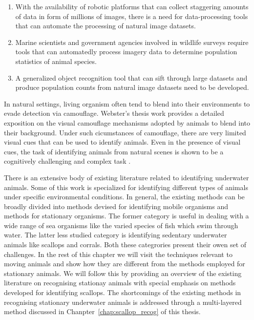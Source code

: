 \documentclass {udthesis}
\begin{document}
\begin{enumerate}[label=Section \arabic*:, start=0]
  \begin{enumerate} [label=Para \arabic*:, start=1]
   
   \item With the availability of robotic platforms that can collect staggering amounts of data in form of millions of images, there is a need for data-processing tools that can automate the processing of natural image datasets.
   
   \item Marine scientists and government agencies involved in wildlife surveys require tools that can automatedly process imagery data to determine population statistics of animal species.
   
   \item A generalized object recognition tool that can sift through large datasets and produce population counts from natural image datasets need to be developed.
   
  \end{enumerate}

\end{enumerate}


In natural settings, living organism often tend to blend into their environments to evade detection via camouflage. Webster's thesis work \cite{webster} provides a detailed exposition on the visual camouflage mechanisms adopted by animals to blend into their background. Under such cicumstances of camouflage, there are very limited visual cues that can be used to identify animals. Even in the presence of visual cues, the task of identifying animals from natural scenes is shown to be a cognitively challenging and complex task \cite{wichmann}.

There is an extensive body of existing literature related to identifying underwater animals. Some of this work is specialized for identifying different types of animals under specific environmental conditions. In general, the existing methods can be broadly divided into methods devised for identifying mobile organisms and methods for stationary organisms. The former category is useful in dealing with a wide range of sea organisms like the varied species of fish which swim through water. The latter less studied category is identifying sedentary underwater animals like scallops and corrals. Both these categrories present their owen set of challenges. In the rest of this chapter we will visit the techniques relevant to moving animals and show how they are different from the methods employed for stationary animals. We will follow this by providing an overview of the existing literature on recognising stationay animals with special emphasis on methods developed for identifying scallops. The shortcomings of the 
existing methods in recognising stationary underwater animals is addressed through a multi-layered method discussed in Chanpter~\ref{chap:scallop_recog} of this thesis.
\end{document}
